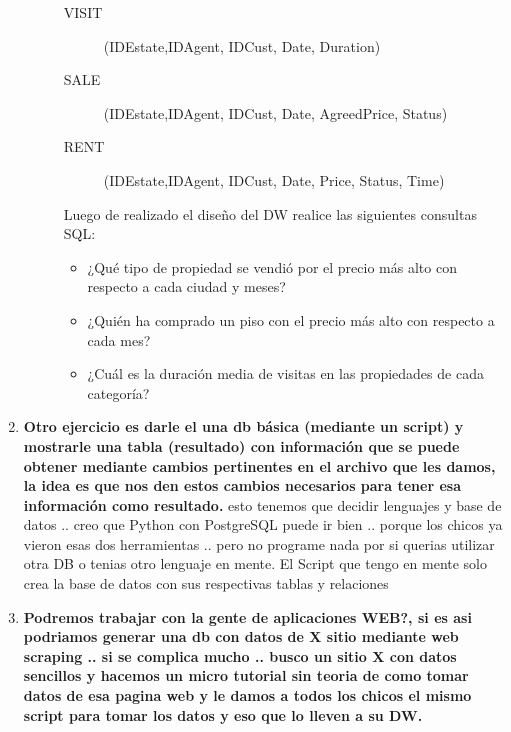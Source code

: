 \documentclass{article}
\begin{document}
\begin{enumerate}
\begin{description}
\begin{description}
		\item[VISIT] (IDEstate,IDAgent, IDCust, Date, Duration)
		\item[SALE] (IDEstate,IDAgent, IDCust, Date, AgreedPrice, Status)
		\item[RENT] (IDEstate,IDAgent, IDCust, Date, Price, Status, Time)
  \end{description}
  Luego de realizado el diseño del DW realice las siguientes consultas SQL:
  \begin{itemize}
	\item ¿Qué tipo de propiedad se vendió por el precio más alto con respecto a cada ciudad
y meses?
	\item ¿Quién ha comprado un piso con el precio más alto con respecto a cada mes?
	\item ¿Cuál es la duración media de visitas en las propiedades de cada categoría?
  \end{itemize}
\end{description}
\item \textbf{Otro ejercicio es darle el una db básica (mediante un script) y
      mostrarle una tabla (resultado) con información que se puede
      obtener mediante cambios pertinentes en el archivo que les
      damos, la idea es que nos den estos cambios necesarios para tener
      esa información como resultado.} esto tenemos que decidir lenguajes y base de datos .. creo que Python con PostgreSQL puede ir bien .. porque los chicos ya vieron esas dos herramientas .. pero no programe nada por si querias utilizar otra DB o tenias otro lenguaje en mente.
      El Script que tengo en mente solo crea la base de datos con sus respectivas tablas y relaciones
\item \textbf{Podremos trabajar con la gente de aplicaciones WEB?, si es asi podriamos generar una db con datos de X sitio mediante web scraping .. si se complica mucho .. busco un sitio X con datos sencillos y hacemos un micro tutorial sin teoria de como tomar datos de esa pagina web y le damos a todos los chicos el mismo script para tomar los datos y eso que lo lleven a su DW.}
\end{enumerate}
\end{document}
